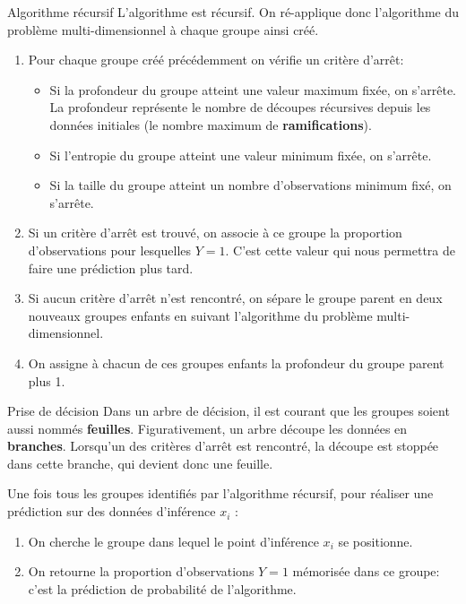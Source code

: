 \begin{frame}{Algorithme récursif}
	L'algorithme est récursif. On ré-applique donc l'algorithme du problème multi-dimensionnel à chaque groupe ainsi créé.
	\begin{enumerate}
		\item Pour chaque groupe créé précédemment on vérifie un critère d'arrêt:
			\begin{itemize}
				\item Si la profondeur du groupe atteint une valeur maximum fixée, on s'arrête. La profondeur représente le nombre de découpes récursives depuis les données initiales (le nombre maximum de \textbf{ramifications}).
				\item Si l'entropie du groupe atteint une valeur minimum fixée, on s'arrête.
				\item Si la taille du groupe atteint un nombre d'observations minimum fixé, on s'arrête.
			\end{itemize}
		\item Si un critère d'arrêt est trouvé, on associe à ce groupe la proportion d'observations pour lesquelles $Y = 1$. C'est cette valeur qui nous permettra de faire une prédiction plus tard.
		\item Si aucun critère d'arrêt n'est rencontré, on sépare le groupe parent en deux nouveaux groupes enfants en suivant l'algorithme du problème multi-dimensionnel.
		\item On assigne à chacun de ces groupes enfants la profondeur du groupe parent plus 1.
	\end{enumerate}
\end{frame}

\begin{frame}{Prise de décision}
	Dans un arbre de décision, il est courant que les groupes soient aussi nommés \textbf{feuilles}. Figurativement, un arbre découpe les données en \textbf{branches}. Lorsqu'un des critères d'arrêt est rencontré, la découpe est stoppée dans cette branche, qui devient donc une feuille.
	
	\pause
	\vspace{0.5cm}
	
	Une fois tous les groupes identifiés par l'algorithme récursif, pour réaliser une prédiction sur des données d'inférence $x_i$ :
	\begin{enumerate}
		\item On cherche le groupe dans lequel le point d'inférence $x_i$ se positionne.
		\pause
		\item On retourne la proportion d'observations $Y = 1$ mémorisée dans ce groupe: c'est la prédiction de probabilité de l'algorithme.
	\end{enumerate}
\end{frame}

